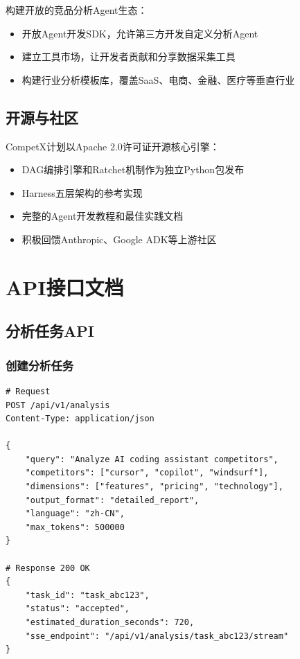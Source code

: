 \documentclass[12pt,a4paper]{ctexrep}
\begin{document}
构建开放的竞品分析Agent生态：

\begin{itemize}[leftmargin=2em]
\item 开放Agent开发SDK，允许第三方开发自定义分析Agent
\item 建立工具市场，让开发者贡献和分享数据采集工具
\item 构建行业分析模板库，覆盖SaaS、电商、金融、医疗等垂直行业
\end{itemize}

\section{开源与社区}

CompetX计划以Apache 2.0许可证开源核心引擎：

\begin{itemize}[leftmargin=2em]
\item DAG编排引擎和Ratchet机制作为独立Python包发布
\item Harness五层架构的参考实现
\item 完整的Agent开发教程和最佳实践文档
\item 积极回馈Anthropic、Google ADK等上游社区
\end{itemize}

\clearpage
{}
{}



\appendix

\chapter{API接口文档}

\section{分析任务API}

\subsection{创建分析任务}

\begin{lstlisting}[language=Python3,caption=POST /api/v1/analysis]
# Request
POST /api/v1/analysis
Content-Type: application/json

{
    "query": "Analyze AI coding assistant competitors",
    "competitors": ["cursor", "copilot", "windsurf"],
    "dimensions": ["features", "pricing", "technology"],
    "output_format": "detailed_report",
    "language": "zh-CN",
    "max_tokens": 500000
}

# Response 200 OK
{
    "task_id": "task_abc123",
    "status": "accepted",
    "estimated_duration_seconds": 720,
    "sse_endpoint": "/api/v1/analysis/task_abc123/stream"
}
\end{lstlisting}
\end{document}
